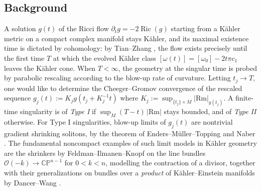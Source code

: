 \documentclass[11pt]{amsart}
\theoremstyle{plain}
\numberwithin{equation}{section}
\theoremstyle{definition}
\theoremstyle{remark}
\begin{document}
\subsection{Background}
A solution $g ( t )$ of the Ricci flow $\partial_t g = - 2 \operatorname{Ric} ( g )$ starting from a K\"ahler metric on a compact complex manifold stays K\"ahler, and its maximal existence time is dictated by cohomology: by Tian--Zhang \cite{TZ}, the flow exists precisely until the first time $T$ at which the evolved K\"ahler class $[ \omega ( t ) ] = [ \omega_0 ] - 2 t \pi c_1$ leaves the K\"ahler cone. When $T < \infty$, the geometry at the singular time is probed by parabolic rescaling according to the blow-up rate of curvature. Letting $t_j \to T$, one would like to determine the Cheeger--Gromov convergence of the rescaled sequence $g_j(t) := K_j g(t_j + K_j^{-1}t)$ where $K_j := \sup_{\{t_j\} \times M} |\textrm{Rm}|_{g(t_j)}$. A finite-time singularity is of \emph{Type I} if $\sup_M ( T - t )\, | \mathrm{Rm} |$ stays bounded, and of \emph{Type II} otherwise. For Type I singularities, blow-up limits of $g_j(t)$ are nontrivial gradient shrinking solitons, by the theorem of Enders--M\"uller--Topping \cite{EMT} and Naber \cite{Naber}. The fundamental noncompact examples of such limit models in K\"ahler geometry are the shrinkers by Feldman--Ilmanen--Knopf \cite{FIK} on the line bundles $\mathcal{O} ( - k ) \to \mathbb{CP}^{n - 1}$ for $0 < k < n$, modelling the contraction of a divisor, together with their generalizations on bundles over a \emph{product} of K\"ahler--Einstein manifolds by Dancer--Wang \cite{DW2011}.
\end{document}
